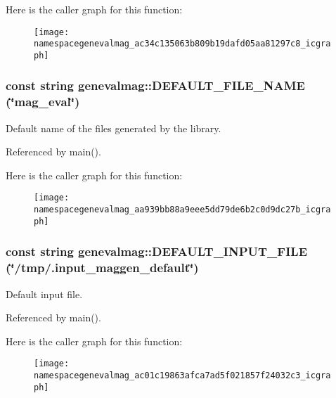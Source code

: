 Here is the caller graph for this function:\nopagebreak
\begin{figure}[H]
\begin{center}
\leavevmode
\texttt{[image: namespacegenevalmag\_ac34c135063b809b19dafd05aa81297c8\_icgraph]}
\end{center}
\end{figure}


\hypertarget{namespacegenevalmag_aa939bb88a9eee5dd79de6b2c0d9dc27b}{
\subsubsection[{DEFAULT\_\-FILE\_\-NAME}]{\setlength{\rightskip}{0pt plus 5cm}const string genevalmag::DEFAULT\_\-FILE\_\-NAME (\char`\"{}mag\_\-eval\char`\"{})}}
\label{namespacegenevalmag_aa939bb88a9eee5dd79de6b2c0d9dc27b}
Default name of the files generated by the library. 

Referenced by main().



Here is the caller graph for this function:\nopagebreak
\begin{figure}[H]
\begin{center}
\leavevmode
\texttt{[image: namespacegenevalmag\_aa939bb88a9eee5dd79de6b2c0d9dc27b\_icgraph]}
\end{center}
\end{figure}


\hypertarget{namespacegenevalmag_ac01c19863afca7ad5f021857f24032c3}{
\subsubsection[{DEFAULT\_\-INPUT\_\-FILE}]{\setlength{\rightskip}{0pt plus 5cm}const string genevalmag::DEFAULT\_\-INPUT\_\-FILE (\char`\"{}/tmp/.input\_\-maggen\_\-default\char`\"{})}}
\label{namespacegenevalmag_ac01c19863afca7ad5f021857f24032c3}
Default input file. 

Referenced by main().



Here is the caller graph for this function:\nopagebreak
\begin{figure}[H]
\begin{center}
\leavevmode
\texttt{[image: namespacegenevalmag\_ac01c19863afca7ad5f021857f24032c3\_icgraph]}
\end{center}
\end{figure}


